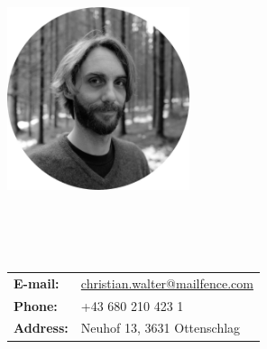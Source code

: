 {
\begin{multicols}{2}

  \begingroup \centering \includegraphics[width=0.4\textwidth]{./figs/chris.jpg} \endgroup\\

  \vspace{0.5cm}

  \\

  \\\\
  \begin{tabular} { l l }
    \textbf{E-mail:} & \href{mailto:christian.walter@mailfence.com}{christian.walter@mailfence.com}\\
    \textbf{Phone:} & +43 680 210 423 1\\
    \textbf{Address:} & Neuhof 13, 3631 Ottenschlag\\
  \end{tabular}

\end{multicols}
}